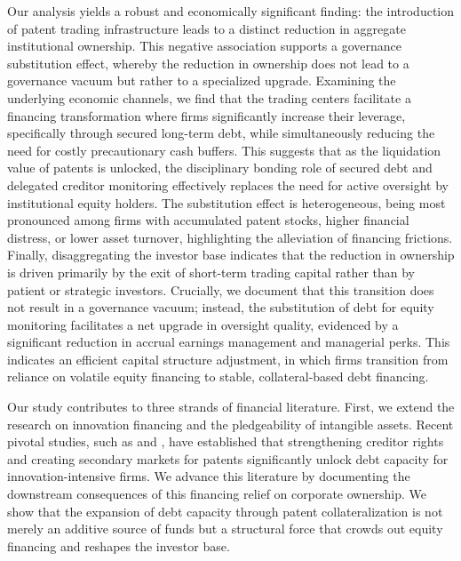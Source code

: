 \documentclass[12pt,a4paper]{article}
\begin{document}
Our analysis yields a robust and economically significant finding: the introduction of patent trading infrastructure leads to a distinct reduction in aggregate institutional ownership. This negative association supports a governance substitution effect, whereby the reduction in ownership does not lead to a governance vacuum but rather to a specialized upgrade. Examining the underlying economic channels, we find that the trading centers facilitate a financing transformation where firms significantly increase their leverage, specifically through secured long-term debt, while simultaneously reducing the need for costly precautionary cash buffers. This suggests that as the liquidation value of patents is unlocked, the disciplinary bonding role of secured debt and delegated creditor monitoring effectively replaces the need for active oversight by institutional equity holders. The substitution effect is heterogeneous, being most pronounced among firms with accumulated patent stocks, higher financial distress, or lower asset turnover, highlighting the alleviation of financing frictions. Finally, disaggregating the investor base indicates that the reduction in ownership is driven primarily by the exit of short-term trading capital rather than by patient or strategic investors. Crucially, we document that this transition does not result in a governance vacuum; instead, the substitution of debt for equity monitoring facilitates a net upgrade in oversight quality, evidenced by a significant reduction in accrual earnings management and managerial perks. This indicates an efficient capital structure adjustment, in which firms transition from reliance on volatile equity financing to stable, collateral-based debt financing.

Our study contributes to three strands of financial literature. First, we extend the research on innovation financing and the pledgeability of intangible assets. Recent pivotal studies, such as \cite{hochberg2018patent} and \cite{megginson2025}, have established that strengthening creditor rights and creating secondary markets for patents significantly unlock debt capacity for innovation-intensive firms. We advance this literature by documenting the downstream consequences of this financing relief on corporate ownership. We show that the expansion of debt capacity through patent collateralization is not merely an additive source of funds but a structural force that crowds out equity financing and reshapes the investor base.
\end{document}
